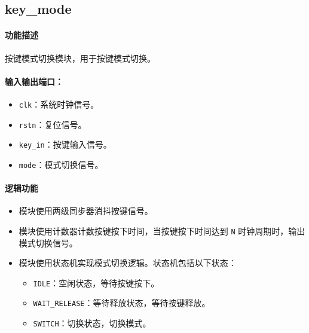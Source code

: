 \documentclass[a4paper]{article}
\begin{document}
\subsection{key\_mode}

\paragraph{功能描述} 按键模式切换模块，用于按键模式切换。

\paragraph{输入输出端口：}
\begin{itemize}
    \item \texttt{clk}：系统时钟信号。
    \item \texttt{rstn}：复位信号。
    \item \texttt{key\_in}：按键输入信号。
    \item \texttt{mode}：模式切换信号。
\end{itemize}

\paragraph{逻辑功能}
\begin{itemize}
    \item 模块使用两级同步器消抖按键信号。
    \item 模块使用计数器计数按键按下时间，当按键按下时间达到 \texttt{N} 时钟周期时，输出模式切换信号。
    \item 模块使用状态机实现模式切换逻辑。状态机包括以下状态：
     \begin{itemize}
        \item \texttt{IDLE}：空闲状态，等待按键按下。
        \item \texttt{WAIT\_RELEASE}：等待释放状态，等待按键释放。
        \item \texttt{SWITCH}：切换状态，切换模式。
     \end{itemize}
\end{itemize}
\end{document}
